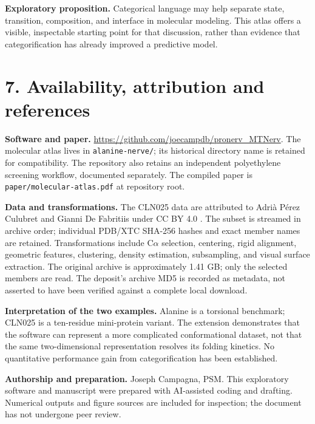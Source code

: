 \documentclass[11pt]{article}
\begin{document}
\textbf{Exploratory proposition.}
Categorical language may help separate state, transition, composition,
and interface in molecular modeling. This atlas offers a visible,
inspectable starting point for that discussion, rather than evidence
that categorification has already improved a predictive model.

\newpage
\section*{7. Availability, attribution and references}
\textbf{Software and paper.}
\url{https://github.com/joecampdb/pronerv_MTNerv}.
The molecular atlas lives in \texttt{alanine-nerve/}; its historical directory
name is retained for compatibility. The repository also retains an independent
polyethylene screening workflow, documented separately. The compiled paper is
\texttt{paper/molecular-atlas.pdf} at repository root.

\textbf{Data and transformations.}
The CLN025 data are attributed to Adri\`a P\'erez Culubret and Gianni De Fabritiis
under CC BY 4.0 \cite{chignolin}. The subset is streamed in archive order;
individual PDB/XTC SHA-256 hashes and exact member names are retained.
Transformations include C$\alpha$ selection, centering, rigid alignment, geometric
features, clustering, density estimation, subsampling, and visual surface extraction.
The original archive is approximately 1.41 GB; only the selected members are read.
The deposit's archive MD5 is recorded as metadata, not asserted to have been
verified against a complete local download.

\textbf{Interpretation of the two examples.}
Alanine is a torsional benchmark; CLN025 is a ten-residue mini-protein variant.
The extension demonstrates that the software can represent a more complicated
conformational dataset, not that the same two-dimensional representation
resolves its folding kinetics. No quantitative performance gain from
categorification has been established.

\textbf{Authorship and preparation.} Joseph Campagna, PSM.
This exploratory software and manuscript were prepared with AI-assisted coding
and drafting. Numerical outputs and figure sources are included for inspection;
the document has not undergone peer review.
\end{document}
